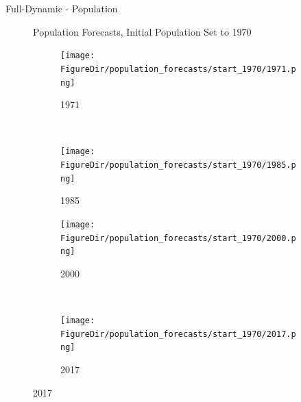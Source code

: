 \documentclass[12pt]{beamer}
\newcommand*{\FigureDir}{../graphs}
\begin{document}
\begin{frame}{Full-Dynamic - Population}

	\begin{figure}[H]
		Population Forecasts, Initial Population Set to 1970
		\begin{subfigure}{0.5\textwidth}
			\centering
			\texttt{[image: \\FigureDir/population\_forecasts/start\_1970/1971.png]}
			\vspace{-5mm}
			\caption{1971}
		\end{subfigure}%
		~ %
		\begin{subfigure}{0.5\textwidth}
			\centering
			\texttt{[image: \\FigureDir/population\_forecasts/start\_1970/1985.png]}
			\vspace{-5mm}
			\caption{1985}
		\end{subfigure}%
		\newline
		\begin{subfigure}{0.5\textwidth}
			\centering
			\texttt{[image: \\FigureDir/population\_forecasts/start\_1970/2000.png]}
			\vspace{-5mm}
			\caption{2000}
		\end{subfigure}%
		~ %
		\begin{subfigure}{0.5\textwidth}
			\centering
			\texttt{[image: \\FigureDir/population\_forecasts/start\_1970/2017.png]}
			\vspace{-5mm}
			\caption{2017}
		\end{subfigure}%
	\end{figure}

\end{frame}
\end{document}
